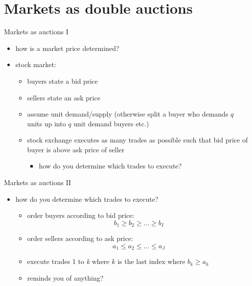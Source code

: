 \documentclass[bigger]{beamer}
\begin{document}
\section{Markets as double auctions}
\label{sec:org74c28a9}
\begin{frame}[label={sec:org8abcf6c}]{Markets as auctions I}
\begin{itemize}
\item how is a market price determined?
\item stock market:
\begin{itemize}
\item buyers state a bid price
\item sellers state an ask price
\item assume unit demand/supply (otherwise split a buyer who demands \(q\) units up into \(q\) unit demand buyers etc.)
\item stock exchange executes as many trades as possible such that bid price of buyer is above ask price of seller
\begin{itemize}
\item how do you determine which trades to execute?
\end{itemize}
\end{itemize}
\end{itemize}
\end{frame}

\begin{frame}[label={sec:org7ed7e3f}]{Markets as auctions II}
\begin{itemize}
\item how do you determine which trades to execute?
\begin{itemize}
\item order buyers according to bid price:
$$b_1\geq b_2\geq\dots\geq b_I$$
\item order sellers according to ask price:
$$a_1\leq a_2\leq\dots\leq a_J$$
\item execute trades 1 to \emph{k} where \(k\) is the last index where \(b_k\geq a_k\)
\item reminds you of anything?
\end{itemize}
\end{itemize}
\end{frame}
\end{document}
